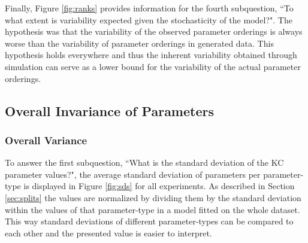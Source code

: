 \documentclass{scrartcl}
\begin{document}
Finally, Figure \ref{fig:ranks} provides information for the fourth subquestion, ``To what extent is variability expected given the stochasticity of the model?". The hypothesis was that the variability of the observed parameter orderings is always worse than the variability of parameter orderings in generated data. This hypothesis holds everywhere and thus the inherent variability obtained through simulation can serve as a lower bound for the variability of the actual parameter orderings. 


\subsection{Overall Invariance of Parameters}
\label{sec:varresults}
\subsubsection{Overall Variance}
To answer the first subquestion, ``What is the standard deviation of the KC parameter values?", the average standard deviation of parameters per parameter-type is displayed in Figure \ref{fig:sds} for all experiments. As described in Section \ref{sec:splits} the values are normalized by dividing them by the standard deviation within the values of that parameter-type in a model fitted on the whole dataset. This way standard deviations of different parameter-types can be compared to each other and the presented value is easier to interpret. 
\end{document}
